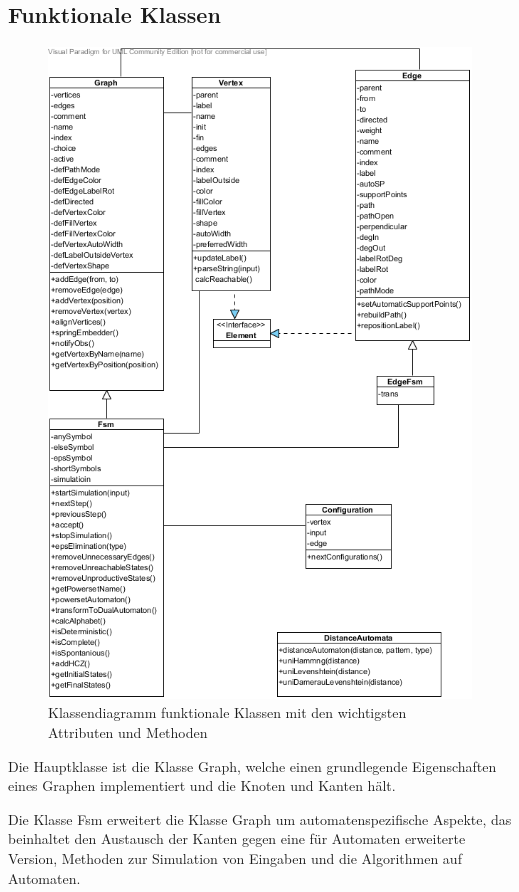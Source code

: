 \subsection{Funktionale Klassen}
\begin{figure}[htbp]
\centering
\includegraphics[width=\linewidth,height=\textheight,keepaspectratio]{pic/fsm}%
\caption{Klassendiagramm funktionale Klassen mit den wichtigsten Attributen und Methoden}%
\end{figure}
Die Hauptklasse ist die Klasse Graph, welche einen grundlegende Eigenschaften eines Graphen implementiert und die Knoten und Kanten hält.

Die Klasse Fsm erweitert die Klasse Graph um automatenspezifische Aspekte, das beinhaltet den Austausch der Kanten gegen eine für Automaten erweiterte Version, Methoden zur Simulation von Eingaben und die Algorithmen auf Automaten.

